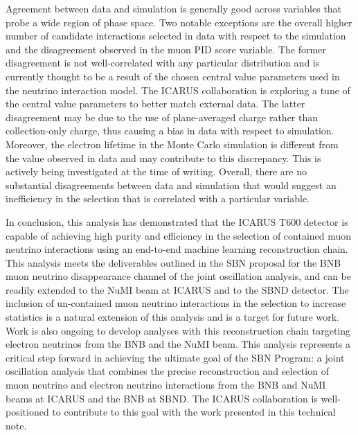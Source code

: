 Agreement between data and simulation is generally good across variables that probe a wide region of phase space. Two notable exceptions are the overall higher number of candidate interactions selected in data with respect to the simulation and the disagreement observed in the muon PID score variable. The former disagreement is not well-correlated with any particular distribution and is currently thought to be a result of the chosen central value parameters used in the neutrino interaction model. The ICARUS collaboration is exploring a tune of the central value parameters to better match external data. The latter disagreement may be due to the use of plane-averaged charge rather than collection-only charge, thus causing a bias in data with respect to simulation. Moreover, the electron lifetime in the Monte Carlo simulation is different from the value observed in data and may contribute to this discrepancy. This is actively being investigated at the time of writing. Overall, there are no substantial disagreements between data and simulation that would suggest an inefficiency in the selection that is correlated with a particular variable.

In conclusion, this analysis has demonstrated that the ICARUS T600 detector is capable of achieving high purity and efficiency in the selection of contained muon neutrino interactions using an end-to-end machine learning reconstruction chain. This analysis meets the deliverables outlined in the SBN proposal for the BNB muon neutrino disappearance channel of the joint oscillation analysis, and can be readily extended to the NuMI beam at ICARUS and to the SBND detector. The inclusion of un-contained muon neutrino interactions in the selection to increase statistics is a natural extension of this analysis and is a target for future work. Work is also ongoing to develop analyses with this reconstruction chain targeting electron neutrinos from the BNB and the NuMI beam. This analysis represents a critical step forward in achieving the ultimate goal of the SBN Program: a joint oscillation analysis that combines the precise reconstruction and selection of muon neutrino and electron neutrino interactions from the BNB and NuMI beams at ICARUS and the BNB at SBND. The ICARUS collaboration is well-positioned to contribute to this goal with the work presented in this technical note.